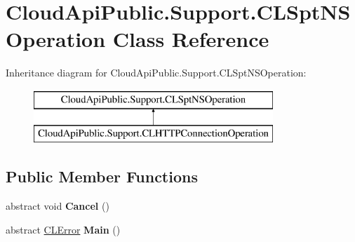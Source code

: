 \hypertarget{class_cloud_api_public_1_1_support_1_1_c_l_spt_n_s_operation}{\section{Cloud\-Api\-Public.\-Support.\-C\-L\-Spt\-N\-S\-Operation Class Reference}
\label{class_cloud_api_public_1_1_support_1_1_c_l_spt_n_s_operation}
}
Inheritance diagram for Cloud\-Api\-Public.\-Support.\-C\-L\-Spt\-N\-S\-Operation\-:\begin{figure}[H]
\begin{center}
\leavevmode
\includegraphics[height=2.000000cm]{class_cloud_api_public_1_1_support_1_1_c_l_spt_n_s_operation}
\end{center}
\end{figure}
\subsection*{Public Member Functions}
\begin{DoxyCompactItemize}
\item 
\hypertarget{class_cloud_api_public_1_1_support_1_1_c_l_spt_n_s_operation_a65c823cd2f48c591f9532fe8971f946f}{abstract void {\bfseries Cancel} ()}\label{class_cloud_api_public_1_1_support_1_1_c_l_spt_n_s_operation_a65c823cd2f48c591f9532fe8971f946f}

\item 
\hypertarget{class_cloud_api_public_1_1_support_1_1_c_l_spt_n_s_operation_acb40342fe5a7ce59ebafe5c68162f3e3}{abstract \hyperlink{class_cloud_api_public_1_1_model_1_1_c_l_error}{C\-L\-Error} {\bfseries Main} ()}\label{class_cloud_api_public_1_1_support_1_1_c_l_spt_n_s_operation_acb40342fe5a7ce59ebafe5c68162f3e3}

\end{DoxyCompactItemize}
